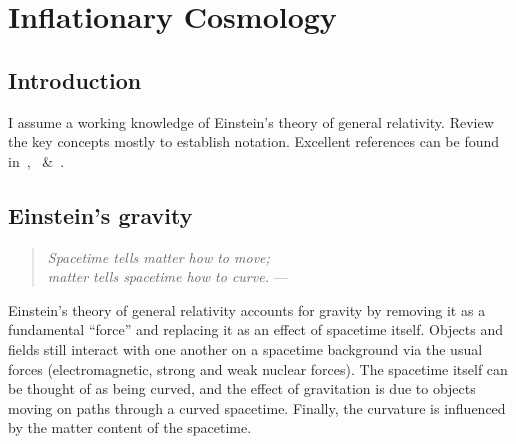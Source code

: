 \chapter{Inflationary Cosmology}
\label{chap:cos}

\section{Introduction}
\label{sec:cos:intro}
I assume a working knowledge of Einstein's theory of general relativity. Review the key concepts mostly to establish notation. Excellent references can be found in~\cite{Wald},~\cite{Hobson} \&~\cite{Dodelson}.

\section{Einstein's gravity}
\label{sec:cos:einsteins_gravity}
\begin{quote}
  {\em Spacetime tells matter how to move;\\ matter tells spacetime how to curve.}\hfill
  --- \johnwheeler{}
\end{quote}

Einstein's theory of general relativity accounts for gravity by removing it as a fundamental ``force'' and replacing it as an effect of spacetime itself. Objects and fields still interact with one another on a spacetime background via the usual forces (electromagnetic, strong and weak nuclear forces). The spacetime itself can be thought of as being curved, and the effect of gravitation is due to objects moving on paths through a curved spacetime. Finally, the curvature is influenced by the matter content of the spacetime.

